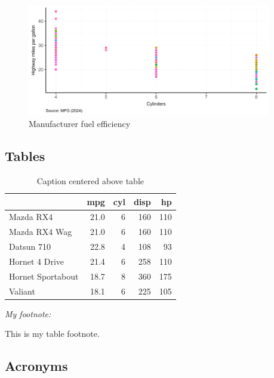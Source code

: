 \documentclass[
12pt,
a4paper,
twoside,
]{article}
\begin{document}
\begin{figure}[htbp]

{\centering \includegraphics[width=0.95\textwidth]{figures/fancyplot} 

}

\caption{Manufacturer fuel efficiency}\label{fig:fancyplot}
\end{figure}

\subsection{Tables}\label{tables}

\begin{table}[H]
\centering
\caption{\label{tab:tab1}Caption centered above table}
\centering
\fontsize{10}{12}\selectfont
\begin{threeparttable}
\begin{tabular}[t]{lrrrr}
\toprule
  & mpg & cyl & disp & hp\\
\midrule
Mazda RX4 & 21.0 & 6 & 160 & 110\\
Mazda RX4 Wag & 21.0 & 6 & 160 & 110\\
Datsun 710 & 22.8 & 4 & 108 & 93\\
Hornet 4 Drive & 21.4 & 6 & 258 & 110\\
Hornet Sportabout & 18.7 & 8 & 360 & 175\\
Valiant & 18.1 & 6 & 225 & 105\\
\bottomrule
\end{tabular}
\begin{tablenotes}[para]
\item \textit{My footnote:} 
\item This is my table footnote.
\end{tablenotes}
\end{threeparttable}
\end{table}

\subsection{Acronyms}\label{acronyms}
\end{document}
